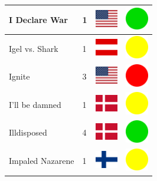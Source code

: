 \documentclass[12pt, a4paper, twoside]{report}
\begin{document}
\begin{center}
\begin{longtable}{|p{5cm}|p{2cm}|p{2cm}|p{2cm}|}
			I Declare War & 1 & \includegraphics[width=1cm]{4x3/us} & \includegraphics[width=1cm]{likes/y} \\ \hline
			Igel vs. Shark & 1 & \includegraphics[width=1cm]{4x3/at} & \includegraphics[width=1cm]{likes/m} \\ \hline
			Ignite & 3 & \includegraphics[width=1cm]{4x3/us} & \includegraphics[width=1cm]{likes/n} \\ \hline
			I'll be damned & 1 & \includegraphics[width=1cm]{4x3/dk} & \includegraphics[width=1cm]{likes/m} \\ \hline
			Illdisposed & 4 & \includegraphics[width=1cm]{4x3/dk} & \includegraphics[width=1cm]{likes/y} \\ \hline
			Impaled Nazarene & 1 & \includegraphics[width=1cm]{4x3/fi} & \includegraphics[width=1cm]{likes/m} \\ \hline

\end{longtable}
\end{center}
\end{document}

